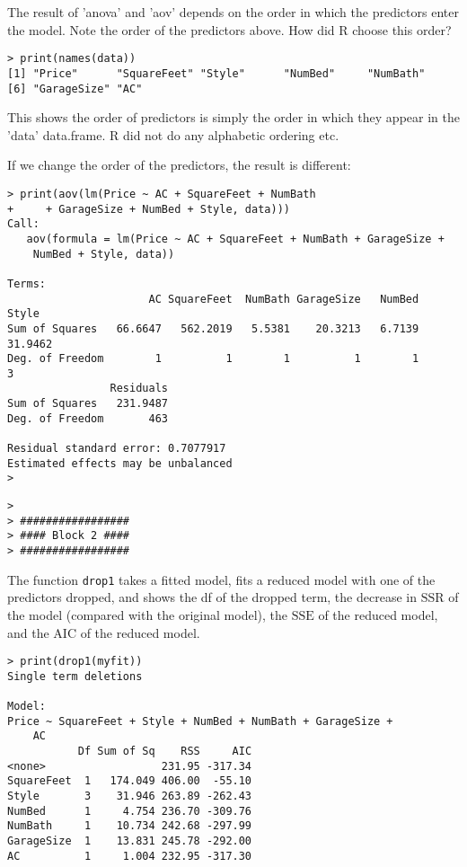 \documentclass[12pt]{article}
\newcommand\SSE{\text{SSE}}
\newcommand\SSR{\text{SSR}}
\begin{document}
The result of 'anova' and 'aov'
depends on the order in which the predictors
enter the model.
Note the order of the predictors above.
How did R choose this order?

\begin{verbatim}
> print(names(data))
[1] "Price"      "SquareFeet" "Style"      "NumBed"     "NumBath"   
[6] "GarageSize" "AC"        
\end{verbatim}

This shows the order of predictors is simply
the order in which they appear in the 'data' data.frame.
R did not do any alphabetic ordering etc.

If we change the order of the predictors,
the result is different:

\begin{verbatim}
> print(aov(lm(Price ~ AC + SquareFeet + NumBath
+     + GarageSize + NumBed + Style, data)))
Call:
   aov(formula = lm(Price ~ AC + SquareFeet + NumBath + GarageSize + 
    NumBed + Style, data))

Terms:
                      AC SquareFeet  NumBath GarageSize   NumBed    Style
Sum of Squares   66.6647   562.2019   5.5381    20.3213   6.7139  31.9462
Deg. of Freedom        1          1        1          1        1        3
                Residuals
Sum of Squares   231.9487
Deg. of Freedom       463

Residual standard error: 0.7077917 
Estimated effects may be unbalanced
> 
\end{verbatim}

\begin{verbatim}
> 
> #################
> #### Block 2 ####
> #################
\end{verbatim}

The function \verb+drop1+
takes a fitted model, fits a reduced model with one of the predictors
dropped, and shows the df of the dropped term,
the decrease in $\SSR$ of the model
(compared with the original model),
the $\SSE$ of the reduced model,
and the AIC of the reduced model.


\begin{verbatim}
> print(drop1(myfit))
Single term deletions

Model:
Price ~ SquareFeet + Style + NumBed + NumBath + GarageSize + 
    AC
           Df Sum of Sq    RSS     AIC
<none>                  231.95 -317.34
SquareFeet  1   174.049 406.00  -55.10
Style       3    31.946 263.89 -262.43
NumBed      1     4.754 236.70 -309.76
NumBath     1    10.734 242.68 -297.99
GarageSize  1    13.831 245.78 -292.00
AC          1     1.004 232.95 -317.30
\end{verbatim}
\end{document}
